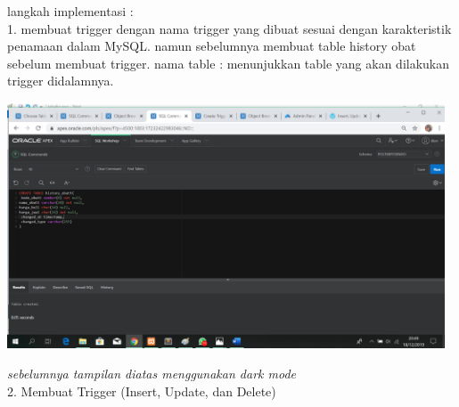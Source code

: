 \documentclass{article}
\begin{document}
langkah implementasi :\\
1. membuat trigger dengan nama trigger yang dibuat sesuai dengan karakteristik penamaan dalam MySQL. namun sebelumnya membuat table history obat sebelum membuat trigger. nama table : menunjukkan table yang akan dilakukan trigger didalamnya. \\

\begin{center}
    \includegraphics[width=13cm]{figure/tablehistory.png}
\end{center}

\textit {sebelumnya tampilan diatas menggunakan dark mode}\\

2. Membuat Trigger (Insert, Update, dan Delete)
\end{document}
